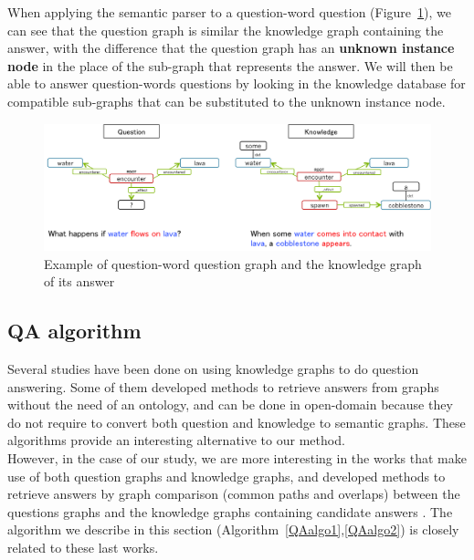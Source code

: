 \documentclass[12pt]{article}
\begin{document}
When applying the semantic parser to a question-word question (Figure~\ref{qWordQuestion}), we can see that the question graph is similar the knowledge graph containing the answer, with the difference that the question graph has an \textbf{unknown instance node} in the place of the sub-graph that represents the answer. We will then be able to answer question-words questions by looking in the knowledge database for compatible sub-graphs that can be substituted to the unknown instance node.

\begin{figure}[!ht]
   \centering \includegraphics[width=\linewidth]{Figures/Question_Answering/qWordQuestion.png}
   \caption{\label{qWordQuestion} Example of question-word question graph and the knowledge graph of its answer}
\end{figure}

\subsection{QA algorithm}

Several studies have been done on using knowledge graphs to do question answering. Some of them developed methods to retrieve answers from graphs without the need of an ontology, and can be done in open-domain \cite{aghaebrahimianopen,hixon2015learning} because they do not require to convert both question and knowledge to semantic graphs. These algorithms provide an interesting alternative to our method.\\
However, in the case of our study, we are more interesting in the works that make use of both question graphs and knowledge graphs, and developed methods to retrieve answers by graph comparison (common paths and overlaps) between the questions graphs and the knowledge graphs containing candidate answers \cite{molla2005learning,molla2006learning,gomez2014graph}. The algorithm we describe in this section (Algorithm~\ref{QAalgo1},\ref{QAalgo2}) is closely related to these last works.
\end{document}
